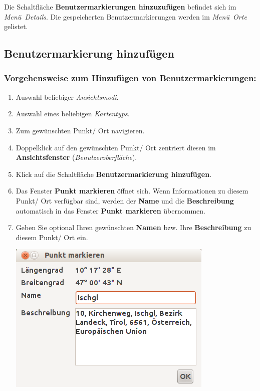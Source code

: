 \documentclass[10pt]{scrreprt}
\newcommand{\textref}[1]{\mbox{\raisebox{0.1ex}{\small$\rightarrow$ }\textit{#1}}}
\begin{document}
Die Schaltfläche \textbf{Benutzermarkierungen hinzuzufügen} befindet sich im \textref{Menü Details}. Die gespeicherten Benutzermarkierungen werden im \textref{Menü Orte} gelistet.


\vspace{3mm}
\subsection{Benutzermarkierung hinzufügen} 


\subsubsection*{Vorgehensweise zum Hinzufügen von Benutzermarkierungen:}
\begin{enumerate}
\item Auswahl beliebiger \textref{Ansichtsmodi}.
\item Auswahl eines beliebigen \textref{Kartentyps}.
\item Zum gewünschten Punkt/ Ort navigieren.
\item Doppelklick auf den gewünschten Punkt/ Ort zentriert diesen im \textbf{Ansichtsfenster} (\textref{Benutzeroberfläche}).
\item Klick auf die Schaltfläche \textbf{Benutzermarkierung hinzufügen}.
\item Das Fenster \textbf{Punkt markieren} öffnet sich. Wenn Informationen zu diesem Punkt/ Ort verfügbar sind, werden der \textbf{Name} und die \textbf{Beschreibung} automatisch in das Fenster \textbf{Punkt markieren} übernommen.
\item Geben Sie optional Ihren gewünschten \textbf{Namen} bzw. Ihre \textbf{Beschreibung} zu diesem Punkt/ Ort ein.
	\vspace{2mm}
	\begin{center}
	\includegraphics[scale=0.35]{images/Benutzermarkierungs_Dialog2.png}

\end{center}
\end{enumerate}
\end{document}
